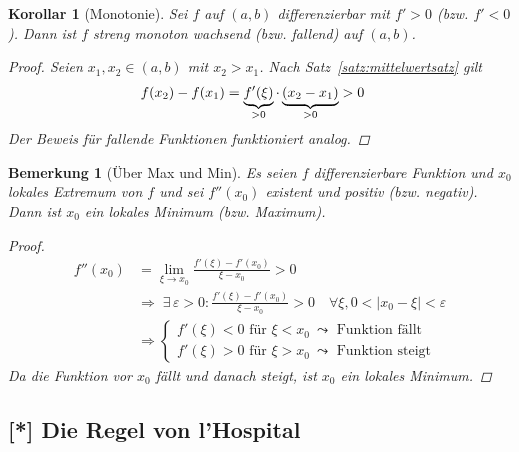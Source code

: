 \documentclass[11pt, twoside, a4paper]{article}
\theoremstyle{plain}
\newtheorem{bemerkung}[blockelement]{Bemerkung}
\newtheorem{korollar}[blockelement]{Korollar}
\newcommand{\pair}[1]{\left(#1\right)}
\newcommand{\of}[1]{\left(#1\right)}
\newcommand{\abs}[1]{\left\lvert#1\right\rvert}
\newcommand{\impl}[0]{\Rightarrow{}}
\newcommand{\fromto}{\rightarrow{}}
\newcommand{\ex}{\;\exists\,}
\begin{document}
    \begin{korollar}[Monotonie] %
        \label{korollar:monotonie}
        Sei $f$ auf $\pair{a,b}$ differenzierbar mit $f' > 0$ (bzw. $f' < 0$). Dann ist $f$ streng monoton wachsend (bzw. fallend) auf $\pair{a,b}$.
        \begin{proof}
            Seien $x_1, x_2\in\pair{a,b}$ mit $x_2 > x_1$. Nach Satz~\ref{satz:mittelwertsatz} gilt
            \begin{align*}
                f(x_2) - f(x_1) &= \underbrace{f'(\xi)}_{> 0}\cdot\underbrace{\pair{x_2 - x_1}}_{> 0} > 0\qedhere
            \end{align*}
            Der Beweis für fallende Funktionen funktioniert analog.
        \end{proof}
    \end{korollar}

    \begin{bemerkung}[Über Max und Min]
        Es seien $f$ differenzierbare Funktion und $x_0$ lokales Extremum von $f$ und sei $f''\of{x_0}$ existent und positiv (bzw. negativ). Dann ist $x_0$ ein lokales Minimum (bzw. Maximum).

        \begin{proof}
            \begin{align*}
                f''\of{x_0} &= \lim_{\xi\fromto x_0} \frac{f'\of{\xi} - f'\of{x_0}}{\xi-x_0} > 0\\
                &\impl \ex\varepsilon > 0\colon \frac{f'\of{\xi} - f'\of{x_0}}{\xi-x_0} > 0\quad\forall\xi, 0 < \abs{x_0-\xi} < \varepsilon\\
                &\impl \begin{cases}
                           f'\of{\xi} < 0 \text{ für } \xi < x_0~\leadsto \text{ Funktion fällt}\\
                           f'\of{\xi} > 0 \text{ für } \xi > x_0~\leadsto \text{ Funktion steigt}
                \end{cases}
            \end{align*}
            Da die Funktion vor $x_0$ fällt und danach steigt, ist $x_0$ ein lokales Minimum.
        \end{proof}
    \end{bemerkung}

    \newpage

    \subsection{[*] Die Regel von l'Hospital}
\end{document}

